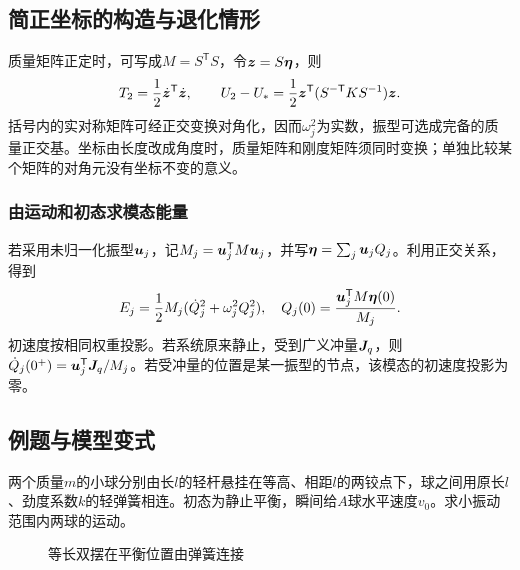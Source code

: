 \subsection{简正坐标的构造与退化情形}
\label{sec:complete4}
质量矩阵正定时，可写成$M=S^{\mathsf T}S$，令$\bm{z}=S\bm{\eta}$，则
\[
 T_2=\frac12\dot{\bm{z}}^{\mathsf T}\dot{\bm{z}},\qquad
 U_2-U_* =\frac12\bm{z}^{\mathsf T}
 (S^{-\mathsf T}KS^{-1})\bm{z}.
\]
括号内的实对称矩阵可经正交变换对角化，因而$\omega_j^2$为实数，振型可选成完备的质量正交基。坐标由长度改成角度时，质量矩阵和刚度矩阵须同时变换；单独比较某个矩阵的对角元没有坐标不变的意义。

\subsubsection{由运动和初态求模态能量}
若采用未归一化振型$\bm{u}_j$，记$M_j=\bm{u}_j^{\mathsf T}M\bm{u}_j$，并写$\bm{\eta}=\sum_j\bm{u}_jQ_j$。利用正交关系，得到
\[
 E_j=\frac12M_j(\dot Q_j^2+\omega_j^2Q_j^2),\quad
 Q_j(0)=\frac{\bm{u}_j^{\mathsf T}M\bm{\eta}(0)}{M_j}.
\]
初速度按相同权重投影。若系统原来静止，受到广义冲量$\bm{J}_q$，则$\dot Q_j(0^+)=\bm{u}_j^{\mathsf T}\bm{J}_q/M_j$。若受冲量的位置是某一振型的节点，该模态的初速度投影为零。

\subsection{例题与模型变式}

\begin{example}[弹簧耦合的双单摆]\label{ex:hw4-3}

两个质量$m$的小球分别由长$l$的轻杆悬挂在等高、相距$l$的两铰点下，球之间用原长$l$、劲度系数$k$的轻弹簧相连。初态为静止平衡，瞬间给$A$球水平速度$v_0$。求小振动范围内两球的运动。

\end{example}


\begin{figure}[H]\centering
{}
\caption{等长双摆在平衡位置由弹簧连接}\label{fig:hw4-3-q}
\end{figure}

